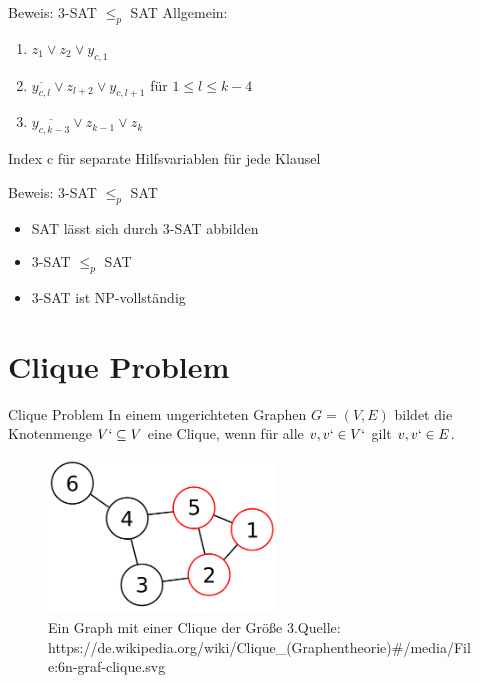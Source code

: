 \documentclass[12pt,donthandout,notes=dontshow,xcolor=table]{beamer}
\begin{document}
\begin{frame}{Beweis: 3-SAT \(\leq_p\) SAT}
Allgemein:
\begin{enumerate}
\item $z_1 \vee z_2 \vee y_{c,1}$
\item $\overline{y_{c,l}} \vee z_{l+2} \vee y_{c,l+1}$ für $1 \le l \le k - 4$
\item $\overline{y_{c,k-3}} \vee z_{k-1} \vee z_k$
\end{enumerate}
Index c für separate Hilfsvariablen für jede Klausel
\end{frame}

\begin{frame}{Beweis: 3-SAT \(\leq_p\) SAT}
\begin{itemize}
\item SAT lässt sich durch 3-SAT abbilden
\item 3-SAT \(\leq_p\) SAT
\item 3-SAT ist NP-vollständig
\end{itemize}
\end{frame}

\section{Clique Problem}
\begin{frame}{Clique Problem}
In einem ungerichteten Graphen $G = (V,E)$ bildet die Knotenmenge $V` \subseteq V$ eine Clique, wenn für alle $v, v` \in V`$ gilt ${v,v`} \in E$. \cite{wegener}
\pause
\begin{figure}
\includegraphics[width=6cm]{figures/clique1.png}
\caption{Ein Graph mit einer Clique der Größe 3.\newline \newline \tiny Quelle: https://de.wikipedia.org/wiki/Clique\_(Graphentheorie)\#/media/File:6n-graf-clique.svg}
\end{figure}
\end{frame}
\end{document}
